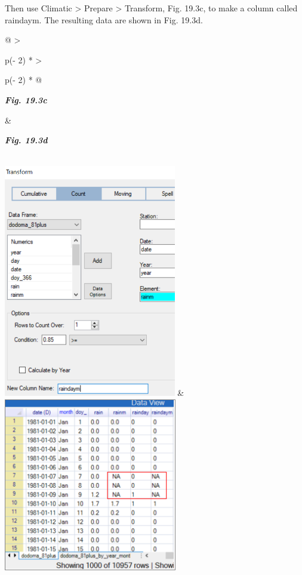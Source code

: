 \documentclass[
  letterpaper,
  DIV=11,
  numbers=noendperiod]{scrreprt}
\begin{document}
Then use Climatic \textgreater{} Prepare \textgreater{} Transform, Fig.
19.3c, to make a column called raindaym. The resulting data are shown in
Fig. 19.3d.

\begin{longtable}[]{@{}
  >{\raggedright\arraybackslash}p{(\columnwidth - 2\tabcolsep) * }
  >{\raggedright\arraybackslash}p{(\columnwidth - 2\tabcolsep) * }@{}}
\toprule\noalign{}
\begin{minipage}[b]{\linewidth}\raggedright
\textbf{\emph{Fig. 19.3c}}
\end{minipage} & \begin{minipage}[b]{\linewidth}\raggedright
\textbf{\emph{Fig. 19.3d}}
\end{minipage} \\
\midrule\noalign{}
\endhead
\bottomrule\noalign{}
\endlastfoot
\includegraphics[width=2.96479in,height=4.01119in]{figures/Fig19.3c.png}
&
\includegraphics[width=2.98045in,height=2.99647in]{figures/Fig19.3d.png} \\
\end{longtable}
\end{document}
